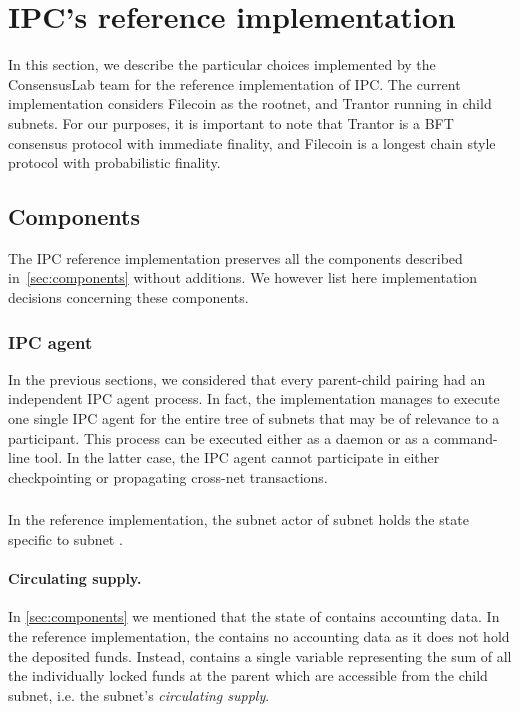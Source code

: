  \section{IPC's reference implementation}
 \label{sec:ref-impl}
 
 In this section, we describe the particular choices implemented by the ConsensusLab team for the reference implementation of IPC.  
 The current implementation considers Filecoin as the rootnet, and Trantor running in child subnets. For our purposes, it is important to note that Trantor is a BFT consensus protocol with immediate finality, and Filecoin is a longest chain style protocol with probabilistic finality. 

\subsection{Components}
The IPC reference implementation preserves all the components described in~\cref{sec:components} without additions. We however list here implementation decisions concerning these components.

 \subsubsection{IPC agent} 
 In the previous sections, we considered that every parent-child pairing had an independent IPC agent process. In fact, the implementation manages to execute one single IPC agent for the entire tree of subnets that may be of relevance to a participant.  This process can be executed either as a daemon or as a command-line tool. In the latter case, the IPC agent cannot participate in either checkpointing or propagating cross-net transactions. 
 

\subsubsection{\sa} In the reference implementation, the subnet actor of subnet  holds the state specific to subnet . 

\paragraph{Circulating supply.}
In \cref{sec:components} we mentioned that the state of \sa contains accounting data. In the reference implementation, the \sa contains no accounting data as it does not hold the deposited funds. Instead, \gw contains a single variable representing the sum of all the individually locked funds at the parent which are accessible from the child subnet, i.e. the subnet's \textit{circulating supply}. 

